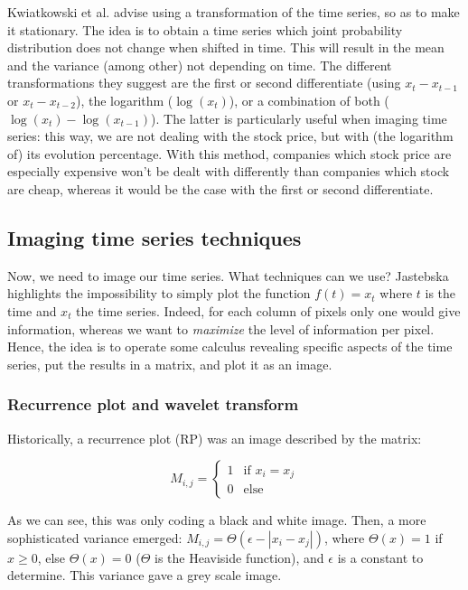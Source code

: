 \documentclass[11pt]{article}
\begin{document}
\begin{onehalfspace}
Kwiatkowski et al. \cite{stationary} advise using a transformation of the time series, so as to make it stationary. The idea is to obtain a time series which joint probability distribution does not change when shifted in time. This will result in the mean and the variance (among other) not depending on time. The different transformations they suggest are the first or second differentiate (using $x_t - x_{t-1}$ or $x_t - x_{t-2}$), the logarithm ($\log(x_t)$), or a combination of both ($\log(x_t) - \log(x_{t-1})$). The latter is particularly useful when imaging time series: this way, we are not dealing with the stock price, but with (the logarithm of) its evolution percentage. With this method, companies which stock price are especially expensive won't be dealt with differently than companies which stock are cheap, whereas it would be the case with the first or second differentiate.

\subsection{Imaging time series techniques}

Now, we need to image our time series. What techniques can we use? Jastebska \cite{jastrebska} highlights the impossibility to simply plot the function $f(t) = x_t$ where $t$ is the time and $x_t$ the time series. Indeed, for each column of pixels only one would give information, whereas we want to \emph{maximize} the level of information per pixel. Hence, the idea is to operate some calculus revealing specific aspects of the time series, put the results in a matrix, and plot it as an image.

\subsubsection{Recurrence plot and wavelet transform}

Historically, a recurrence plot (RP) was an image described by the matrix: 

\begin{equation}
    M_{i,j} = \begin{cases}
        1 & \text{if } x_i = x_j \\
        0 & \text{else}
    \end{cases}
\end{equation}

As we can see, this was only coding a black and white image. Then, a more sophisticated variance emerged: $M_{i,j} = \Theta(\epsilon - |x_i - x_j|)$, where $\Theta(x) = 1$ if $x \geq 0$, else $\Theta(x) = 0$ ($\Theta$ is the Heaviside function), and $\epsilon$ is a constant to determine. This variance gave a grey scale image. 


\end{onehalfspace}
\end{document}
